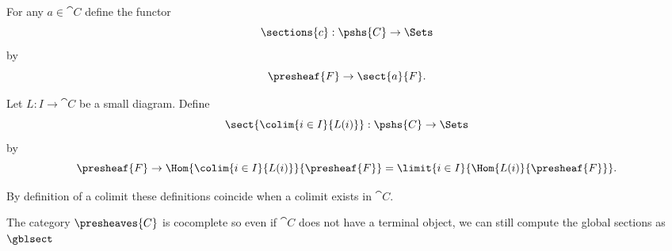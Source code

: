 \begin{definition}
For any $a\in \cat{C}$ define the functor 
\[\sections{c}: \pshs{C} \rightarrow \Sets\]
by
\[\presheaf{F} \rightarrow \sect{a}{F}.\]

Let $L: I \rightarrow \cat{C}$ be a small diagram. 
Define 
\[\sect{\colim{i \in I}{L(i)}}: \pshs{C} \rightarrow \Sets\]
by
\[\presheaf{F} \rightarrow \Hom{\colim{i\in I}{L(i)}}{\presheaf{F}} 
	= \limit{i\in I}{\Hom{L(i)}{\presheaf{F}}}.
\]

By definition of a colimit these definitions coincide when a colimit exists in $\cat{C}$.
\end{definition}

\begin{remark}
The category $\presheaves{C}$ is cocomplete 
so even if $\cat{C}$ does not have a terminal object, 
we can still compute the global sections as $\gblsect$
\end{remark}